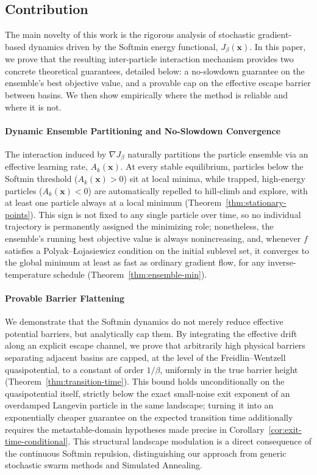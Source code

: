 \documentclass{article}
\theoremstyle{plain}
\theoremstyle{definition}
\theoremstyle{remark}
\newcommand{\prefactor}[2]{A_{#1}(#2)}
\newcommand{\xx}{\mathbf{x}}
\begin{document}
\subsection{Contribution}
The main novelty of this work is the rigorous analysis of stochastic gradient-based dynamics driven by the Softmin energy functional, $J_\beta(\xx)$. In this paper, we prove that the resulting inter-particle interaction mechanism provides two concrete theoretical guarantees, detailed below: a no-slowdown guarantee on the ensemble's best objective value, and a provable cap on the effective escape barrier between basins. We then show empirically where the method is reliable and where it is not.

\paragraph{Dynamic Ensemble Partitioning and No-Slowdown Convergence} The interaction induced by $\nabla J_\beta$ naturally partitions the particle ensemble via an effective learning rate, $\prefactor{k}{\xx}$. At every stable equilibrium, particles below the Softmin threshold ($\prefactor{k}{\xx} > 0$) sit at local minima, while trapped, high-energy particles ($\prefactor{k}{\xx} < 0$) are automatically repelled to hill-climb and explore, with at least one particle always at a local minimum (Theorem~\ref{thm:stationary-points}). This sign is not fixed to any single particle over time, so no individual trajectory is permanently assigned the minimizing role; nonetheless, the ensemble's running best objective value is always nonincreasing, and, whenever $f$ satisfies a Polyak--\L{}ojasiewicz condition on the initial sublevel set, it converges to the global minimum at least as fast as ordinary gradient flow, for any inverse-temperature schedule (Theorem~\ref{thm:ensemble-min}).

\paragraph{Provable Barrier Flattening} We demonstrate that the Softmin dynamics do not merely reduce effective potential barriers, but analytically cap them. By integrating the effective drift along an explicit escape channel, we prove that arbitrarily high physical barriers separating adjacent basins are capped, at the level of the Freidlin--Wentzell quasipotential, to a constant of order $1/\beta$, uniformly in the true barrier height (Theorem~\ref{thm:transition-time}). This bound holds unconditionally on the quasipotential itself, strictly below the exact small-noise exit exponent of an overdamped Langevin particle in the same landscape; turning it into an exponentially cheaper guarantee on the expected transition time additionally requires the metastable-domain hypotheses made precise in Corollary~\ref{cor:exit-time-conditional}. This structural landscape modulation is a direct consequence of the continuous Softmin repulsion, distinguishing our approach from generic stochastic swarm methods and Simulated Annealing.
\end{document}
